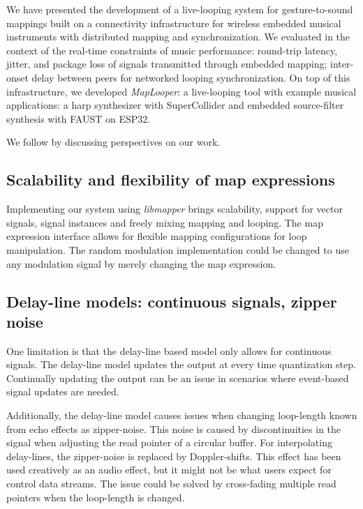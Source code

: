 \documentclass[sigconf]{nimeart}
\begin{document}
We have presented the development of a live-looping system for gesture-to-sound mappings built on a connectivity infrastructure for wireless embedded musical instruments with distributed mapping and synchronization. We evaluated in the context of the real-time constraints of music performance: round-trip latency, jitter, and package loss of signals transmitted through embedded mapping; inter-onset delay between peers for networked looping synchronization. On top of this infrastructure, we developed \emph{MapLooper}: a live-looping tool with example musical applications: a harp synthesizer with SuperCollider and embedded source-filter synthesis with FAUST on ESP32.

We follow by discussing perspectives on our work.

\subsection{Scalability and flexibility of map expressions}\label{scalability-and-flexibility-of-map-expressions}

Implementing our system using \emph{libmapper} brings scalability, support for vector signals, signal instances \cite{c40} and freely mixing mapping and looping. The map expression interface allows for flexible mapping configurations for loop manipulation. The random modulation implementation could be changed to use any modulation signal by merely changing the map expression.

\subsection{Delay-line models: continuous signals, zipper noise}\label{delay-line-models-continuous-signals-zipper-noise}

One limitation is that the delay-line based model only allows for continuous signals. The delay-line model updates the output at every time quantization step. Continually updating the output can be an issue in scenarios where event-based signal updates are needed.

Additionally, the delay-line model causes issues when changing loop-length known from echo effects as zipper-noise. This noise is caused by discontinuities in the signal when adjusting the read pointer of a circular buffer. For interpolating delay-lines, the zipper-noise is replaced by Doppler-shifts. This effect has been used creatively as an audio effect, but it might not be what users expect for control data streams. The issue could be solved by cross-fading multiple read pointers when the loop-length is changed.
\end{document}
